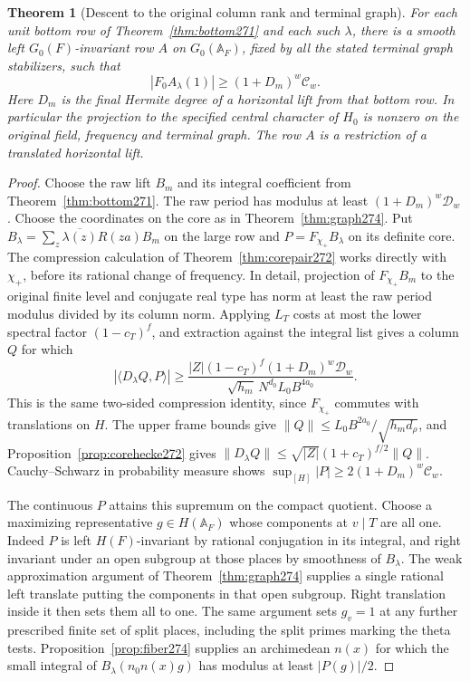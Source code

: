 \documentclass[a4paper,11pt]{article}
\newtheorem{theorem}[proposition]{Theorem}
\theoremstyle{definition}
\theoremstyle{remark}
\numberwithin{equation}{section}
\begin{document}
\begin{theorem}[Descent to the original column rank and terminal graph]\leavevmode
\label{thm:small274}
For each unit bottom row of Theorem~\ref{thm:bottom271} and each
such \(\lambda\), there is a smooth left \(G_0(F)\)-invariant
row \(A\) on \(G_0(\mathbb A_F)\), fixed by all the stated
terminal graph stabilizers, such that
\[
          |F_0 A_\lambda(1)|\ge (1+D_m)^w\mathcal C_w .
\]
Here \(D_m\) is the final Hermite degree of a horizontal lift
from that bottom row. In particular the projection to the
specified central character of \(H_0\) is nonzero on the
original field, frequency and terminal graph. The row \(A\)
is a restriction of a translated horizontal lift.
\end{theorem}
\begin{proof}
Choose the raw lift \(B_m\) and its integral coefficient from
Theorem~\ref{thm:bottom271}. The raw period has modulus at least
\((1+D_m)^w\mathcal D_w\). Choose the coordinates on the core
as in Theorem~\ref{thm:graph274}. Put
\(B_\lambda=\sum_z\overline{\lambda(z)}R(za)B_m\) on the
large row and \(P=F_{\chi_+}B_\lambda\) on its definite core.
The compression calculation of Theorem~\ref{thm:corepair272}
works directly with \(\chi_+\), before its rational change
of frequency. In detail, projection of \(F_{\chi_+}B_m\)
to the original finite level and conjugate real type has
norm at least the raw period modulus divided by its column
norm. Applying \(L_T\) costs at most the lower spectral
factor \((1-c_T)^f\), and extraction against the integral
list gives a column \(Q\) for which
\[
 |\langle D_\lambda Q,P\rangle|
 \ge\frac{|Z|(1-c_T)^f(1+D_m)^w\mathcal D_w}
              {\sqrt{h_m}\,N^{d_0}L_0 B^{4a_0}} .
\]
This is the same two-sided compression identity, since
\(F_{\chi_+}\) commutes with translations on \(H\).
The upper frame bounds give
\(\|Q\|\le L_0 B^{2a_0}/\sqrt{h_m d_\rho}\), and
Proposition~\ref{prop:corehecke272} gives
\(\|D_\lambda Q\|\le\sqrt{|Z|}(1+c_T)^{f/2}\|Q\|\).
Cauchy--Schwarz in probability measure shows
\(\sup_{[H]}|P|\ge 2(1+D_m)^w\mathcal C_w\).

The continuous \(P\) attains this supremum on the compact
quotient. Choose a maximizing representative \(g\in H(\mathbb A_F)\)
whose components at \(v\mid T\) are all one. Indeed \(P\) is
left \(H(F)\)-invariant by rational conjugation in its integral,
and right invariant under an open subgroup at those places
by smoothness of \(B_\lambda\). The weak approximation argument
of Theorem~\ref{thm:graph274} supplies a single rational left
translate putting the components in that open subgroup.
Right translation inside it then sets them all to one. The same
argument sets \(g_v=1\) at any further prescribed finite set of
split places, including the split primes marking the theta tests.
Proposition~\ref{prop:fiber274} supplies an archimedean
\(n(x)\) for which the small integral of
\(B_\lambda(n_0 n(x)g)\) has modulus at least \(|P(g)|/2\).


\end{proof}
\end{document}
